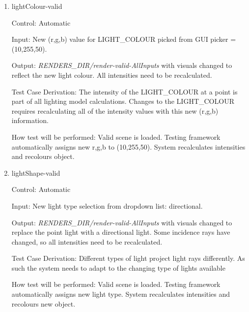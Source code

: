 \documentclass[12pt, titlepage]{article}
\begin{document}
\begin{enumerate}
	\item{lightColour-valid\\}
	
	Control: Automatic
	
	Input: New (r,g,b) value for LIGHT\_COLOUR picked from GUI picker = 
	(10,255,50).
	
	Output: \textit{RENDERS\_DIR/render-valid-AllInputs} with visuals changed 
	to reflect the new light colour. All intensities need to be 
	recalculated.
	
	Test Case Derivation: The intensity of the LIGHT\_COLOUR at a point is part 
	of all lighting model calculations. Changes to the LIGHT\_COLOUR requires 
	recalculating all of the intensity values with this new (r,g,b) information.
	
	How test will be performed: Valid scene is loaded. Testing framework 
	automatically assigns new r,g,b to (10,255,50). System recalculates 
	intensities and recolours object.		


	\item{lightShape-valid\\}
	
	Control: Automatic
	
	Input: New light type selection from dropdown list: directional.
	
	Output: \textit{RENDERS\_DIR/render-valid-AllInputs} with visuals changed 
	to replace the point light with a directional light. Some incidence rays 
	have changed, so all intensities need to be recalculated.
	
	Test Case Derivation: Different types of light project light rays 
	differently. As such the system needs to adapt to the changing type of 
	lights available
	
	How test will be performed: Valid scene is loaded. Testing framework 
	automatically assigns new light type. System recalculates 
	intensities and recolours new object.
	
\end{enumerate}

\end{document}
